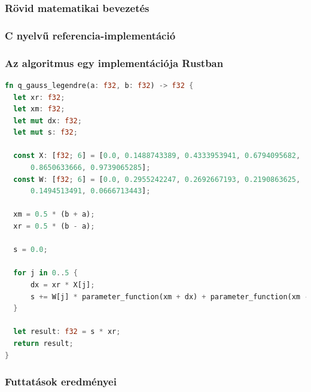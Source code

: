 \subsubsection{Rövid matematikai bevezetés}
\subsubsection{C nyelvű referencia-implementáció}
\subsubsection{Az algoritmus egy implementációja Rustban}
\begin{lstlisting}[language=Rust]
fn q_gauss_legendre(a: f32, b: f32) -> f32 {
  let xr: f32;
  let xm: f32;
  let mut dx: f32;
  let mut s: f32;
  
  const X: [f32; 6] = [0.0, 0.1488743389, 0.4333953941, 0.6794095682,
      0.8650633666, 0.9739065285];
  const W: [f32; 6] = [0.0, 0.2955242247, 0.2692667193, 0.2190863625,
      0.1494513491, 0.0666713443];
  
  xm = 0.5 * (b + a);
  xr = 0.5 * (b - a);
  
  s = 0.0;
  
  for j in 0..5 {
	  dx = xr * X[j];
	  s += W[j] * parameter_function(xm + dx) + parameter_function(xm - dx);
  }
  
  let result: f32 = s * xr;
  return result;
}  
\end{lstlisting}

\subsubsection{Futtatások eredményei}

